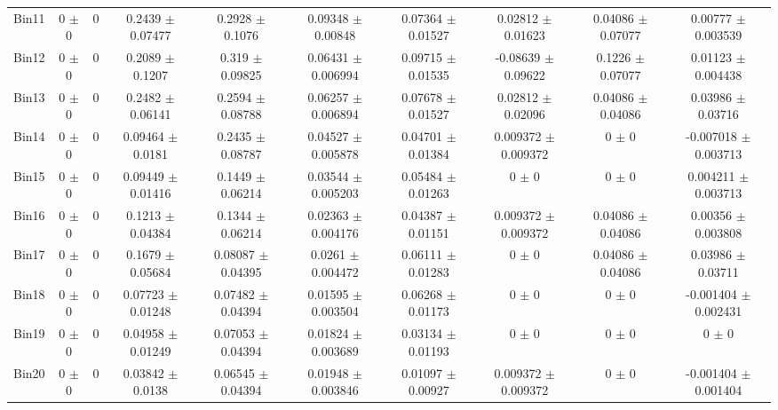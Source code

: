 \begin{tabular}{@{\extracolsep{4pt}}lccccccccc@{}}
     Bin11 & 0 $\pm$ 0 & 0 & 0.2439 $\pm$ 0.07477 & 0.2928 $\pm$ 0.1076 & 0.09348 $\pm$ 0.00848 & 0.07364 $\pm$ 0.01527 & 0.02812 $\pm$ 0.01623 & 0.04086 $\pm$ 0.07077 & 0.00777 $\pm$ 0.003539 \\ 
     Bin12 & 0 $\pm$ 0 & 0 & 0.2089 $\pm$ 0.1207 & 0.319 $\pm$ 0.09825 & 0.06431 $\pm$ 0.006994 & 0.09715 $\pm$ 0.01535 & -0.08639 $\pm$ 0.09622 & 0.1226 $\pm$ 0.07077 & 0.01123 $\pm$ 0.004438 \\ 
     Bin13 & 0 $\pm$ 0 & 0 & 0.2482 $\pm$ 0.06141 & 0.2594 $\pm$ 0.08788 & 0.06257 $\pm$ 0.006894 & 0.07678 $\pm$ 0.01527 & 0.02812 $\pm$ 0.02096 & 0.04086 $\pm$ 0.04086 & 0.03986 $\pm$ 0.03716 \\ 
     Bin14 & 0 $\pm$ 0 & 0 & 0.09464 $\pm$ 0.0181 & 0.2435 $\pm$ 0.08787 & 0.04527 $\pm$ 0.005878 & 0.04701 $\pm$ 0.01384 & 0.009372 $\pm$ 0.009372 & 0 $\pm$ 0 & -0.007018 $\pm$ 0.003713 \\ 
     Bin15 & 0 $\pm$ 0 & 0 & 0.09449 $\pm$ 0.01416 & 0.1449 $\pm$ 0.06214 & 0.03544 $\pm$ 0.005203 & 0.05484 $\pm$ 0.01263 & 0 $\pm$ 0 & 0 $\pm$ 0 & 0.004211 $\pm$ 0.003713 \\ 
     Bin16 & 0 $\pm$ 0 & 0 & 0.1213 $\pm$ 0.04384 & 0.1344 $\pm$ 0.06214 & 0.02363 $\pm$ 0.004176 & 0.04387 $\pm$ 0.01151 & 0.009372 $\pm$ 0.009372 & 0.04086 $\pm$ 0.04086 & 0.00356 $\pm$ 0.003808 \\ 
     Bin17 & 0 $\pm$ 0 & 0 & 0.1679 $\pm$ 0.05684 & 0.08087 $\pm$ 0.04395 & 0.0261 $\pm$ 0.004472 & 0.06111 $\pm$ 0.01283 & 0 $\pm$ 0 & 0.04086 $\pm$ 0.04086 & 0.03986 $\pm$ 0.03711 \\ 
     Bin18 & 0 $\pm$ 0 & 0 & 0.07723 $\pm$ 0.01248 & 0.07482 $\pm$ 0.04394 & 0.01595 $\pm$ 0.003504 & 0.06268 $\pm$ 0.01173 & 0 $\pm$ 0 & 0 $\pm$ 0 & -0.001404 $\pm$ 0.002431 \\ 
     Bin19 & 0 $\pm$ 0 & 0 & 0.04958 $\pm$ 0.01249 & 0.07053 $\pm$ 0.04394 & 0.01824 $\pm$ 0.003689 & 0.03134 $\pm$ 0.01193 & 0 $\pm$ 0 & 0 $\pm$ 0 & 0 $\pm$ 0 \\ 
     Bin20 & 0 $\pm$ 0 & 0 & 0.03842 $\pm$ 0.0138 & 0.06545 $\pm$ 0.04394 & 0.01948 $\pm$ 0.003846 & 0.01097 $\pm$ 0.00927 & 0.009372 $\pm$ 0.009372 & 0 $\pm$ 0 & -0.001404 $\pm$ 0.001404 \\ 
\hline\hline
  \end{tabular}
